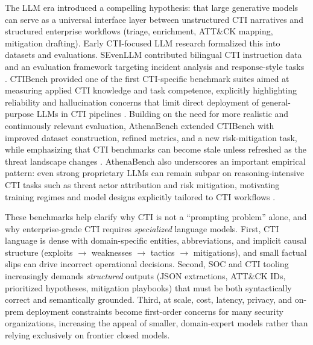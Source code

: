 The LLM era introduced a compelling hypothesis: that large generative models can serve as a universal interface layer between unstructured CTI narratives and structured enterprise workflows (triage, enrichment, ATT\&CK mapping, mitigation drafting). Early CTI-focused LLM research formalized this into datasets and evaluations. SEvenLLM contributed bilingual CTI instruction data and an evaluation framework targeting incident analysis and response-style tasks \cite{ji2024sevenllm}. CTIBench provided one of the first CTI-specific benchmark suites aimed at measuring applied CTI knowledge and task competence, explicitly highlighting reliability and hallucination concerns that limit direct deployment of general-purpose LLMs in CTI pipelines \cite{alam2024ctibench}. Building on the need for more realistic and continuously relevant evaluation, AthenaBench extended CTIBench with improved dataset construction, refined metrics, and a new risk-mitigation task, while emphasizing that CTI benchmarks can become stale unless refreshed as the threat landscape changes \cite{alam2025athenabench}. AthenaBench also underscores an important empirical pattern: even strong proprietary LLMs can remain subpar on reasoning-intensive CTI tasks such as threat actor attribution and risk mitigation, motivating training regimes and model designs explicitly tailored to CTI workflows \cite{alam2025athenabench}.

These benchmarks help clarify why CTI is not a ``prompting problem'' alone, and why enterprise-grade CTI requires \emph{specialized} language models. First, CTI language is dense with domain-specific entities, abbreviations, and implicit causal structure (exploits $\rightarrow$ weaknesses $\rightarrow$ tactics $\rightarrow$ mitigations), and small factual slips can drive incorrect operational decisions. Second, SOC and CTI tooling increasingly demands \emph{structured} outputs (JSON extractions, ATT\&CK IDs, prioritized hypotheses, mitigation playbooks) that must be both syntactically correct and semantically grounded. Third, at scale, cost, latency, privacy, and on-prem deployment constraints become first-order concerns for many security organizations, increasing the appeal of smaller, domain-expert models rather than relying exclusively on frontier closed models.

